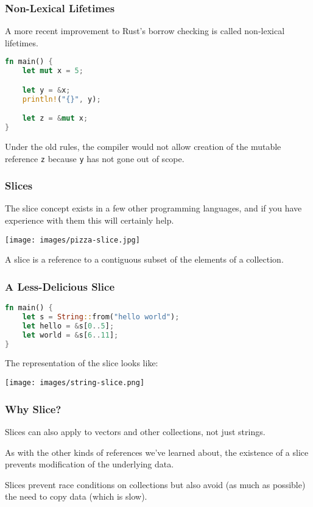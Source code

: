 \begin{frame}[fragile]
\frametitle{Non-Lexical Lifetimes}

A more recent improvement to Rust's borrow checking is called non-lexical lifetimes.

\begin{lstlisting}[language=Rust]
fn main() {
    let mut x = 5;

    let y = &x;
    println!("{}", y);

    let z = &mut x;
}
\end{lstlisting}

Under the old rules, the compiler would not allow creation of the mutable reference \texttt{z} because \texttt{y} has not gone out of scope.

\end{frame}


\begin{frame}
\frametitle{Slices}

The \alert{slice} concept exists in a few other programming languages, and if you have experience with them this will certainly help.

\begin{center}
	\texttt{[image: images/pizza-slice.jpg]}
\end{center}

A slice is a reference to a contiguous subset of the elements of a collection. 

\end{frame}


\begin{frame}[fragile]
\frametitle{A Less-Delicious Slice}

\begin{lstlisting}[language=Rust]
fn main() {
    let s = String::from("hello world");
    let hello = &s[0..5];
    let world = &s[6..11];
}
\end{lstlisting}

The representation of the slice looks like:
\begin{center}
	\texttt{[image: images/string-slice.png]}
\end{center}

\end{frame}


\begin{frame}
\frametitle{Why Slice?}

Slices can also apply to vectors and other collections, not just strings. 

As with the other kinds of references we've learned about, the existence of a slice prevents modification of the underlying data. 

Slices prevent race conditions on collections but also avoid (as much as possible) the need to copy data (which is slow).

\end{frame}


